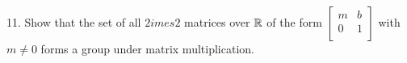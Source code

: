 \begin{mdframed}[style=darkQuesion]
11. Show that the set of all $2  imes 2$ matrices over $\mathbb{R}$ of the form
$\begin{bmatrix}
  m & b \\
  0 & 1 \\
  \end{bmatrix}$ with $m\neq 0$ forms a group under matrix multiplication.
\end{mdframed}

